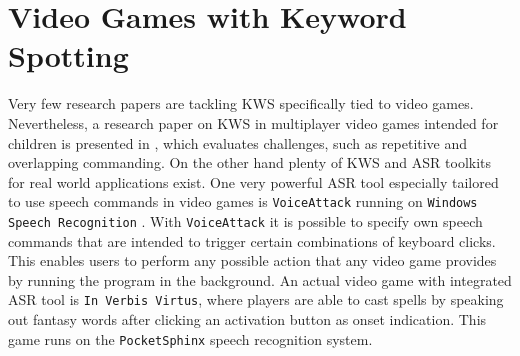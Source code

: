 
\section{Video Games with Keyword Spotting}\label{sec:prev_kws_games}
Very few research papers are tackling KWS specifically tied to video games.
Nevertheless, a research paper on KWS in multiplayer video games intended for children is presented in \cite{Harshavardhan2015}, which evaluates challenges, such as repetitive and overlapping commanding.
On the other hand plenty of KWS and ASR toolkits for real world applications exist.
One very powerful ASR tool especially tailored to use speech commands in video games is \texttt{VoiceAttack} running on \texttt{Windows Speech Recognition} \cite{Xiong2017}.
With \texttt{VoiceAttack} it is possible to specify own speech commands that are intended to trigger certain combinations of keyboard clicks.
This enables users to perform any possible action that any video game provides by running the program in the background.
An actual video game with integrated ASR tool is \texttt{In Verbis Virtus}, where players are able to cast spells by speaking out fantasy words after clicking an activation button as onset indication.
This game runs on the \texttt{PocketSphinx} \cite{Huggins2006} speech recognition system.